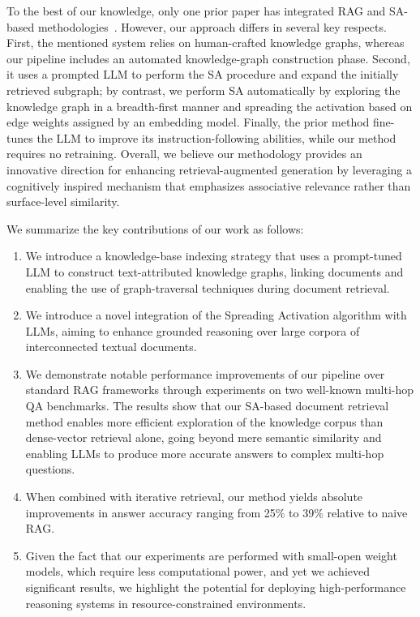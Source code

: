 \documentclass{article}
\begin{document}
To the best of our knowledge, only one prior paper has integrated RAG and SA-based methodologies~\cite{wu2025kg}. However, our approach differs in several key respects. First, the mentioned system relies on human-crafted knowledge graphs, whereas our pipeline includes an automated knowledge-graph construction phase. Second, it uses a prompted LLM to perform the SA procedure and expand the initially retrieved subgraph; by contrast, we perform SA automatically by exploring the knowledge graph in a breadth-first manner and spreading the activation based on edge weights assigned by an embedding model. Finally, the prior method fine-tunes the LLM to improve its instruction-following abilities, while our method requires no retraining. Overall, we believe our methodology provides an innovative direction for enhancing retrieval-augmented generation by leveraging a cognitively inspired mechanism that emphasizes associative relevance rather than surface-level similarity.

We summarize the key contributions of our work as follows:

\begin{enumerate}
    \item We introduce a knowledge-base indexing strategy that uses a prompt-tuned LLM to construct text-attributed knowledge graphs, linking documents and enabling the use of graph-traversal techniques during document retrieval.
    \item We introduce a novel integration of the Spreading Activation algorithm with LLMs, aiming to enhance grounded reasoning over large corpora of interconnected textual documents.
    \item We demonstrate notable performance improvements of our pipeline over standard RAG frameworks through experiments on two well-known multi-hop QA benchmarks. The results show that our SA-based document retrieval method enables more efficient exploration of the knowledge corpus than dense-vector retrieval alone, going beyond mere semantic similarity and enabling LLMs to produce more accurate answers to complex multi-hop questions.
    \item When combined with iterative retrieval, our method yields absolute improvements in answer accuracy ranging from 25\% to 39\% relative to naive RAG.
    \item Given the fact that our experiments are performed with small-open weight models, which require less computational power, and yet we achieved significant results, we highlight the potential for deploying high-performance reasoning systems in resource-constrained environments.
\end{enumerate}
\end{document}
